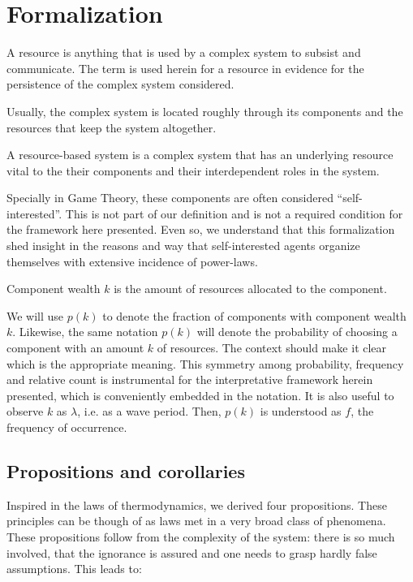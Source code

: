 \documentclass[a4paper, 11pt]{article} %
\newenvironment{definition}[1][Definition]{\begin{trivlist}
\item[\hskip \labelsep {\bfseries #1}]}{\end{trivlist}}
\begin{document}
\section{Formalization}\label{sec:form}

\begin{definition}
	A resource is anything that is used by a complex system to subsist and communicate. The term is used herein for a resource in evidence for the persistence of the complex system considered.
\end{definition}

 Usually, the complex system is located roughly through its components and the resources that keep the system altogether.

\begin{definition}
	A resource-based system is a complex system that has an underlying resource vital to the their components and their interdependent roles in the system.
\end{definition}

Specially in Game Theory, these components are often considered
``self-interested''. This is not part of our definition and
is not a required condition for the framework here presented.
Even so, we understand that this formalization shed insight
in the reasons and way that self-interested agents
organize themselves
with extensive incidence of power-laws.

\begin{definition}
	Component wealth $k$ is the amount of resources allocated to the component.
\end{definition}

We will use $p(k)$ to denote the fraction of components with component wealth $k$. Likewise, the same notation $p(k)$ will denote the probability of choosing a component with an amount $k$ of resources.
The context should make it clear which is the appropriate meaning.
This symmetry among probability, frequency and relative count is
instrumental for the interpretative framework herein presented,
which is conveniently embedded in the notation.
It is also useful to observe 
$k$ as $\lambda$, i.e. as a wave period.
Then, $p(k)$ is understood as  $f$, the
frequency of occurrence.

\subsection{Propositions and corollaries}

Inspired in the laws of thermodynamics, we derived four
propositions.
These principles can be though of as laws met in
a very broad class of phenomena.
These propositions follow from the complexity of the system:
there is so much involved, that the ignorance is assured and
one needs to grasp hardly false assumptions. 
This leads to:
\end{document}
